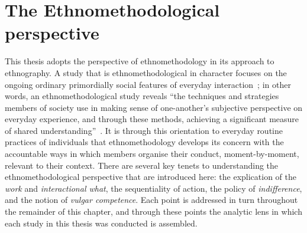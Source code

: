 \section{The Ethnomethodological perspective}\label{sec:background approach em}
\begin{revisedsubmission}
This thesis adopts the perspective of ethnomethodology in its approach to ethnography.
A study that is ethnomethodological in character focuses on the ongoing ordinary primordially social features of everyday interaction~\citep{Schegloff1987}; in other words, an ethnomethodological study reveals ``the techniques and strategies members of society use in making sense of one-another’s subjective perspective on everyday experience, and through these methods, achieving a significant measure of shared understanding''~\citep[p. 30]{Reeves2011}.
It is through this orientation to everyday routine practices of individuals that ethnomethodology develops its concern with the accountable ways in which members organise their conduct, moment-by-moment, relevant to their context.
There are several key tenets to understanding the ethnomethodological perspective that are introduced here: the explication of the \textit{work} and \textit{interactional what}, the sequentiality of action, the policy of \textit{indifference}, and the notion of \textit{vulgar competence}.
Each point is addressed in turn throughout the remainder of this chapter, and through these points the analytic lens in which each study in this thesis was conducted is assembled.
\end{revisedsubmission}






